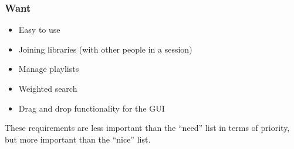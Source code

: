 \subsubsection{Want}


\begin{itemize}
	\item Easy to use 
	\item Joining libraries (with other people in a session)
	\item Manage playlists
	\item Weighted search
	\item Drag and drop functionality for the GUI
\end{itemize}


These requirements are less important than the ``need'' list in terms of
priority, but more important than the ``nice'' list.